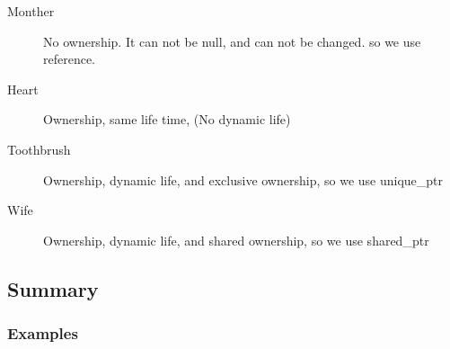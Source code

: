 \documentclass[a4paper,11pt,twoside]{book}
\begin{document}
\begin{itemize}
\begin{enumerate}
\begin{description}
	\item[Monther] No ownership. It can not be null, and can not be changed.  so we use reference. 
	
	\item[Heart] Ownership, same life time, (No dynamic life)
	
	\item [Toothbrush] Ownership, dynamic life, and exclusive ownership, so we use unique\_ptr
	
	\item [Wife] Ownership, dynamic life, and shared ownership, so we use shared\_ptr
\end{description}

\end{enumerate}


	
\end{itemize}
\subsection{Summary}

\subsubsection{Examples}
\end{document}
